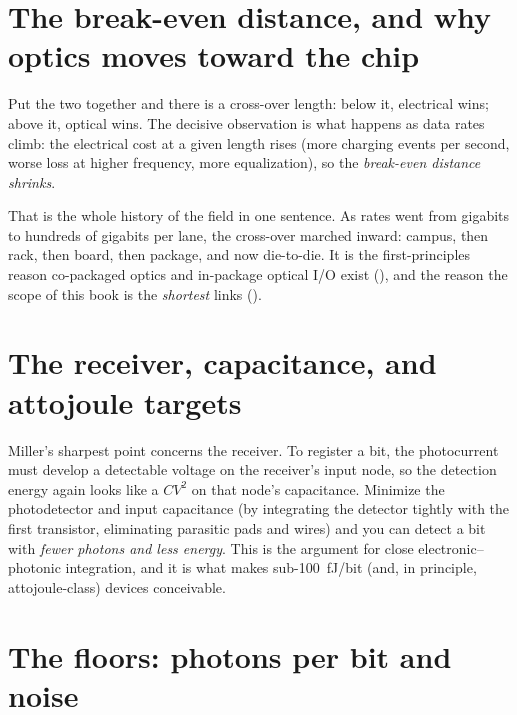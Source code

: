 
\section{The break-even distance, and why optics moves toward the chip}

Put the two together and there is a cross-over length: below it, electrical wins;
above it, optical wins. The decisive observation is what happens as data rates
climb: the electrical cost at a given length rises (more charging events per
second, worse loss at higher frequency, more equalization), so the \emph{break-even
distance shrinks}.

That is the whole history of the field in one sentence. As rates went from
gigabits to hundreds of gigabits per lane, the cross-over marched inward: campus,
then rack, then board, then package, and now die-to-die. It is the first-principles
reason co-packaged optics and in-package optical I/O exist
(), and the reason the scope of this book is the
\emph{shortest} links ().

\section{The receiver, capacitance, and attojoule targets}

Miller's sharpest point concerns the receiver. To register a bit, the photocurrent
must develop a detectable voltage on the receiver's input node, so the detection
energy again looks like a $C V^{2}$ on that node's capacitance. Minimize the
photodetector and input capacitance (by integrating the detector tightly with the
first transistor, eliminating parasitic pads and wires) and you can detect a bit
with \emph{fewer photons and less energy}. This is the argument for close
electronic--photonic integration, and it is what makes sub-100~fJ/bit (and, in
principle, attojoule-class) devices conceivable.


\section{The floors: photons per bit and noise}

